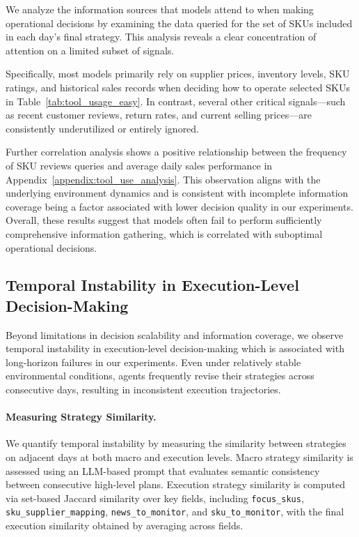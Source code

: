 

We analyze the information sources that models attend to when making operational decisions by examining the data queried for the set of SKUs included in each day’s final strategy. This analysis reveals a clear concentration of attention on a limited subset of signals.

Specifically, most models primarily rely on supplier prices, inventory levels, SKU ratings, and historical sales records when deciding how to operate selected SKUs in Table~\ref{tab:tool_usage_easy}. In contrast, several other critical signals—such as recent customer reviews, return rates, and current selling prices—are consistently underutilized or entirely ignored.



Further correlation analysis shows a positive relationship between the frequency of SKU reviews queries and average daily sales performance in Appendix~\ref{appendix:tool_use_analysis}. This observation aligns with the underlying environment dynamics and is consistent with incomplete information coverage being a factor associated with lower decision quality in our experiments. Overall, these results suggest that models often fail to perform sufficiently comprehensive information gathering, which is correlated with suboptimal operational decisions.

\subsection{Temporal Instability in Execution-Level Decision-Making}

Beyond limitations in decision scalability and information coverage, we observe temporal instability in execution-level decision-making which is associated with long-horizon failures in our experiments. Even under relatively stable environmental conditions, agents frequently revise their strategies across consecutive days, resulting in inconsistent execution trajectories.

\paragraph{Measuring Strategy Similarity.}
We quantify temporal instability by measuring the similarity between strategies on adjacent days at both macro and execution levels. Macro strategy similarity is assessed using an LLM-based prompt that evaluates semantic consistency between consecutive high-level plans. Execution strategy similarity is computed via set-based Jaccard similarity over key fields, including \texttt{focus\_skus}, \texttt{sku\_supplier\_mapping}, \texttt{news\_to\_monitor}, and \texttt{sku\_to\_monitor}, with the final execution similarity obtained by averaging across fields.


